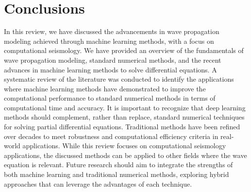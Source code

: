 \documentclass[11pt,twoside]{article}
\begin{document}
\section{Conclusions}\label{sec:conclusions}

In this review, we have discussed the advancements in wave propagation modeling achieved through machine learning
methods, with a focus on computational seismology. We have provided an overview of the fundamentals of wave
propagation modeling, standard numerical methods, and the recent advances in machine learning methods to solve
differential equations. A systematic review of the literature was conducted to identify the applications where
machine learning methods have demonstrated to improve the computational performance to standard numerical methods in terms
of computational time and accuracy. It is important to recognize that deep learning methods should complement, 
rather than replace, standard numerical techniques for solving partial differential equations. Traditional methods 
have been refined over decades to meet robustness and computational efficiency criteria in real-world applications. 
While this review focuses on computational seismology applications, the discussed methods can be applied to other 
fields where the wave equation is relevant. Future research should aim to integrate the strengths of both machine 
learning and traditional numerical methods, exploring hybrid approaches that can leverage the advantages of each 
technique.


\end{document}
